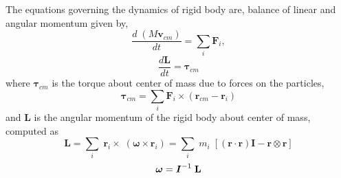 \documentclass[preprint,12pt]{elsarticle}
\newcommand{\teng}[1]{\ensuremath{\boldsymbol{#1}}}
\newcommand{\ten}[1]{\ensuremath{\mathbf{#1}}}
\begin{document}
The equations governing the dynamics of rigid body are, balance of linear and
angular momentum given by,
\begin{equation}
  \label{eq:balance_linear_mom}
  \frac{d \; (M \ten{v}_{cm})}{d t} = \sum_i \ten{F}_i,
\end{equation}
\begin{equation}
  \label{eq:balance_angular_mom}
  \frac{d \ten{L}}{d t} = \teng{\tau}_{cm}
\end{equation}
where $\teng{\tau}_{cm}$ is the torque about center of mass due to forces on the
particles,
\begin{equation}
  \label{eq:torque}
  \teng{\tau}_{cm} = \sum_i \ten{F}_i \times (\ten{r}_{cm} - \ten{r}_{i})
\end{equation}
and $\ten{L}$ is the angular momentum of the rigid body about center of mass,
computed as
\begin{equation}
  \label{eq:moi}
  \teng{L} =
  \sum_i \; \ten{r}_i \times \; (\ten{\omega} \times \ten{r}_i)
  = \sum_i \; m_i \; [(\ten{r} \cdot \ten{r}) \ten{I} - \ten{r} \otimes \ten{r}]
\end{equation}
\begin{equation}
  \label{eq:omega_compute}
  \teng{\omega} = \textit{\teng{I}}^{-1} \; \ten{L}
\end{equation}
\end{document}
